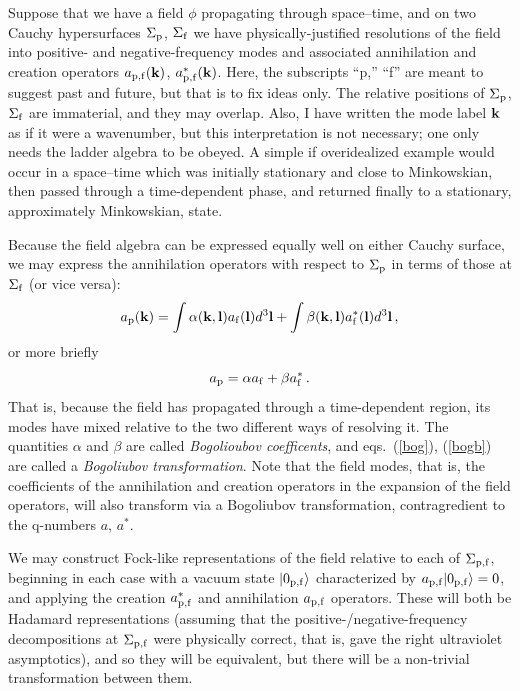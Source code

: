 \documentclass[12pt]{article}
\begin{document}
Suppose that we have a field $\phi$ propagating through space--time, and on two Cauchy hypersurfaces $\Sigma _{\rm p}$, $\Sigma _{\rm f}$ we have physically-justified resolutions of the field into positive- and negative-frequency modes and associated annihilation and creation operators $a_{\rm p,f}({\bf k})$, $a^*_{\rm p,f}({\bf k})$.  Here, the subscripts ``p,'' ``f'' are meant to suggest past and future, but that is to fix ideas only.  The relative positions of $\Sigma _{\rm p}$, $\Sigma _{\rm f}$ are immaterial, and they may overlap.  Also, I have written the mode label ${\bf k}$ as if it were a wavenumber, but this interpretation is not necessary; one only needs the ladder algebra to be obeyed.
A simple if overidealized example would occur in a space--time which was initially stationary and close to Minkowskian, then passed through a time-dependent phase, and returned finally to a stationary, approximately Minkowskian, state.  


Because the field algebra can be expressed equally well on either Cauchy surface, we may express the annihilation operators with respect to $\Sigma _{\rm p}$ in terms of those at $\Sigma _{\rm f}$ (or vice versa):
\begin{equation}\label{bog}
  a_{\rm p}({\bf k}) =\int \alpha ({\bf k},{\bf l}) a_{\rm f}({\bf l})d^3{\bf l}
  +\int \beta ({\bf k},{\bf l}) a^*_{\rm f}({\bf l})d^3{\bf l}\, ,
\end{equation}
or more briefly
\begin{equation}\label{bogb}
  a_{\rm p} =\alpha  a_{\rm f}
  +\beta a^*_{\rm f}\, .
\end{equation}
That is, because the field has propagated through a time-dependent region, its modes have mixed relative to the two different ways of resolving it.  The quantities $\alpha$ and $\beta$ are called {\em Bogolioubov coefficents}, and eqs.~(\ref{bog}), (\ref{bogb}) are called a {\em Bogoliubov transformation}.  Note that the field modes, that is, the coefficients of the annihilation and creation operators in the expansion of the field operators, will also transform via a Bogoliubov transformation, contragredient to the q-numbers $a$, $a^*$.

We may construct Fock-like representations of the field relative to each of $\Sigma _{\rm p,f}$, beginning in each case with a  vacuum state $|0_{\rm p,f}\rangle$ characterized by $a_{\rm p,f}|0_{\rm p,f}\rangle =0$, and applying the creation $a^*_{\rm p,f}$ and annihilation $a_{\rm p,f}$ operators.  These will both be Hadamard representations (assuming that the positive-/negative-frequency decompositions at $\Sigma _{\rm p,f}$ were physically correct, that is, gave the right ultraviolet asymptotics), and so they will be equivalent, but there will be a non-trivial transformation between them.
\end{document}
